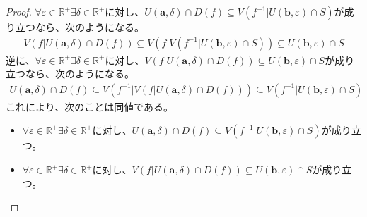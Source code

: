 \documentclass[dvipdfmx]{jsarticle}
\begin{document}
\begin{proof}
$\forall\varepsilon \in \mathbb{R}^{+}\exists\delta \in \mathbb{R}^{+}$に対し、$U\left( \mathbf{a},\delta \right) \cap D(f) \subseteq V\left( f^{- 1}|U\left( \mathbf{b},\varepsilon \right) \cap S \right)$が成り立つなら、次のようになる。
\begin{align*}
V\left( f|U\left( \mathbf{a},\delta \right) \cap D(f) \right) \subseteq V\left( f|V\left( f^{- 1}|U\left( \mathbf{b},\varepsilon \right) \cap S \right) \right) \subseteq U\left( \mathbf{b},\varepsilon \right) \cap S
\end{align*}
逆に、$\forall\varepsilon \in \mathbb{R}^{+}\exists\delta \in \mathbb{R}^{+}$に対し、$V\left( f|U\left( \mathbf{a},\delta \right) \cap D(f) \right) \subseteq U\left( \mathbf{b},\varepsilon \right) \cap S$が成り立つなら、次のようになる。
\begin{align*}
U\left( \mathbf{a},\delta \right) \cap D(f) \subseteq V\left( f^{- 1}|V\left( f|U\left( \mathbf{a},\delta \right) \cap D(f) \right) \right) \subseteq V\left( f^{- 1}|U\left( \mathbf{b},\varepsilon \right) \cap S \right)
\end{align*}
これにより、次のことは同値である。
\begin{itemize}
\item
  $\forall\varepsilon \in \mathbb{R}^{+}\exists\delta \in \mathbb{R}^{+}$に対し、$U\left( \mathbf{a},\delta \right) \cap D(f) \subseteq V\left( f^{- 1}|U\left( \mathbf{b},\varepsilon \right) \cap S \right)$が成り立つ。
\item
  $\forall\varepsilon \in \mathbb{R}^{+}\exists\delta \in \mathbb{R}^{+}$に対し、$V\left( f|U\left( \mathbf{a},\delta \right) \cap D(f) \right) \subseteq U\left( \mathbf{b},\varepsilon \right) \cap S$が成り立つ。
\end{itemize}
\end{proof}
\end{document}
